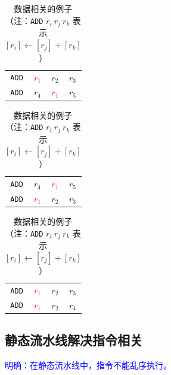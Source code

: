 \documentclass[UTF8]{ctexart}
\begin{document}
\begin{table}[htb]
    \begin{minipage}[t]{.32\textwidth}
        \centering
        \begin{tabular}{|cccc|}
        \hline
            \verb!ADD! & \textcolor{red}{$r_1$} & $r_2$ & $r_3$ \\
            \verb!ADD! & $r_4$ & \textcolor{red}{$r_1$} & $r_5$ \\
        \hline
        \end{tabular}
    \end{minipage}
    \begin{minipage}[t]{.32\textwidth}
        \centering
        \begin{tabular}{|cccc|}
        \hline
            \verb!ADD! & $r_4$ & \textcolor{red}{$r_1$} & $r_5$ \\
            \verb!ADD! & \textcolor{red}{$r_1$} & $r_2$ & $r_3$ \\
        \hline
        \end{tabular}
    \end{minipage}
    \begin{minipage}[t]{.32\textwidth}
        \centering
        \begin{tabular}{|cccc|}
        \hline
            \verb!ADD! & \textcolor{red}{$r_1$} & $r_2$ & $r_3$ \\
            \verb!ADD! & \textcolor{red}{$r_1$} & $r_2$ & $r_4$ \\
        \hline
        \end{tabular}
    \end{minipage}
    \caption{数据相关的例子（注：\texttt{ADD} $r_i\ r_j\ r_k$ 表示 $[r_i]\gets [r_j]+[r_k]$）}\label{tab:instruction-hazard}
\end{table}

\subsection{静态流水线解决指令相关}

\textcolor{blue}{明确：在静态流水线中，指令不能乱序执行。}
\end{document}
